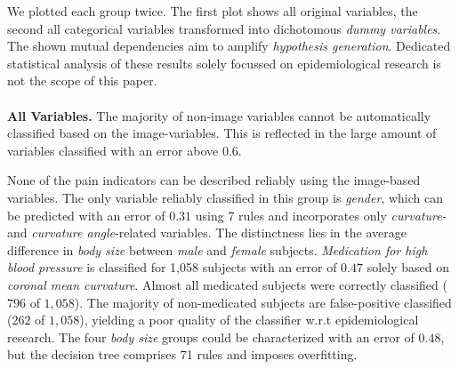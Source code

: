 \documentclass[a4paper,twoside]{style/article}
\begin{document}
We plotted each group twice.
The first plot shows all original variables, the second all categorical variables transformed into dichotomous \emph{dummy variables}.
The shown mutual dependencies aim to amplify \emph{hypothesis generation}.
Dedicated statistical analysis of these results solely focussed on epidemiological research is not the scope of this paper.
\\\\
\noindent \textbf{All Variables.}
The majority of non-image variables cannot be automatically classified based on the image-variables.
This is reflected in the large amount of variables classified with an error above $0.6$.

None of the pain indicators can be described reliably using the image-based variables.
The only variable reliably classified in this group is \emph{gender}, which can be predicted with an error of $0.31$ using 7 rules and incorporates only \emph{curvature-} and \emph{curvature angle}-related variables.
%
The distinctness lies in the average difference in \emph{body size} between \emph{male} and \emph{female} subjects.
\emph{Medication for high blood pressure} is classified for 1,058 subjects with an error of $0.47$ solely based on \emph{coronal mean curvature}.
Almost all medicated subjects were correctly classified ($796$ of $1,058$).
The majority of non-medicated subjects are false-positive classified ($262$ of $1,058$), yielding a poor quality of the classifier w.r.t epidemiological research.
The four \emph{body size} groups could be characterized with an error of $0.48$, but the decision tree comprises 71 rules and imposes overfitting.
\end{document}
